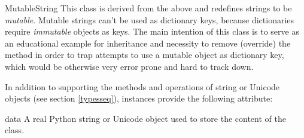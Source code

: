 \begin{classdesc}{MutableString}{}
This class is derived from the  above and redefines
strings to be \emph{mutable}.  Mutable strings can't be used as
dictionary keys, because dictionaries require \emph{immutable} objects as
keys.  The main intention of this class is to serve as an educational
example for inheritance and necessity to remove (override) the
 method in order to trap attempts to use a
mutable object as dictionary key, which would be otherwise very
error prone and hard to track down.
\end{classdesc}

In addition to supporting the methods and operations of string  or
Unicode objects (see section \ref{typesseq}),  instances
provide the following attribute:

\begin{memberdesc}{data}
A real Python string or Unicode object used to store the content of the
 class.
\end{memberdesc}

